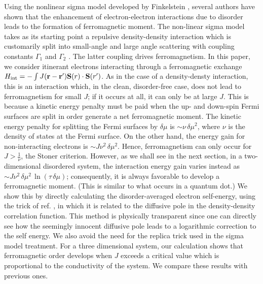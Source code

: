 \documentclass[prb,twocolumn]{revtex4}
\begin{document}
Using the nonlinear sigma model developed by
Finkelstein \cite{Finkelstein}, several
authors \cite{Belitz,Chamon,Nayak} have shown that the enhancement
of electron-electron interactions due to disorder leads to the formation of
ferromagnetic moment. The non-linear sigma model takes as its starting point
a repulsive density-density interaction which is customarily split into small-angle
and large angle scattering with coupling constants $\Gamma_1$ and $\Gamma_2$
\cite{Finkelstein}. The latter coupling drives ferromagnetism.
In this paper, we consider itinerant electrons interacting through a
ferromagnetic exchange $H_{\rm int}=-\int J({\bf r}-{\bf r'}){\bf S}(r)\cdot {\bf S}(r')$.
As in the case of a density-densty interaction, this is an interaction
which, in the clean, disorder-free case, does not lead to ferromagnetism
for small $J$; if it occurs at all, it can only be at large $J$.
This is because a kinetic energy penalty must be paid when
the up- and down-spin Fermi surfaces are split in order
generate a net ferromagnetic moment. The kinetic energy penalty
for splitting the Fermi surfaces by $\delta\mu$ is $\sim \nu\, \delta\mu^2$,
where $\nu$ is the density of states at the Fermi surface. On the other
hand, the energy gain for non-interacting electrons is $\sim J {\nu^2}\, \delta\mu^2$.
Hence, ferromagnetism can only occur for $J>\frac{1}{\nu}$, the Stoner criterion.
However, as we shall see in the next section, in
a two-dimensional disordered system, the interaction energy gain
varies instead as $\sim J {\nu^2}\, {\delta\mu^2}\,\ln(\tau\, {\delta\mu})$;
consequently, it is always favorable to develop a ferromagnetic moment.
(This is similar to what occurs in a quantum dot\cite{Andreev98}.)
We show this by directly calculating the disorder-averaged
electron self-energy, using the trick of ref. , in which
it is related to the diffusive pole in the density-density correlation
function. This method is physically transparent since one can directly see how the
seemingly innocent diffusive pole leads to a logarithmic
correction to the self energy. We also avoid the need for the replica
trick used in the sigma model treatment. For a three dimensional system, our
calculation shows that ferromagnetic order develops when
$J$ exceeds a critical value which is proportional to the
conductivity of the system. We compare these results with previous ones.
\end{document}
